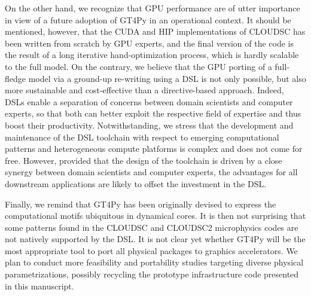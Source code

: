 \documentclass[main.tex]{subfiles}
\begin{document}
    On the other hand, we recognize that GPU performance are of utter importance in view of a future adoption of GT4Py in an operational context. It should be mentioned, however, that the CUDA and HIP implementations of CLOUDSC has been written from scratch by GPU experts, and the final version of the code is the result of a long iterative hand-optimization process, which is hardly scalable to the full model. On the contrary, we believe that the GPU porting of a full-fledge model via a ground-up re-writing using a DSL is not only possible, but also more sustainable and cost-effective than a directive-based approach. Indeed, DSLs enable a separation of concerns between domain scientists and computer experts, so that both can better exploit the respective field of expertise and thus boost their productivity. Notwithstanding, we stress that the development and maintenance of the DSL toolchain with respect to emerging computational patterns and heterogeneous compute platforms is complex and does not come for free. However, provided that the design of the toolchain is driven by a close synergy between domain scientists and computer experts, the advantages for all downstream applications are likely to offset the investment in the DSL.

    Finally, we remind that GT4Py has been originally devised to express the computational motifs ubiquitous in dynamical cores. It is then not surprising that some patterns found in the CLOUDSC and CLOUDSC2 microphysics codes are not natively supported by the DSL. %
    It is not clear yet whether GT4Py will be the most appropriate tool to port all physical packages to graphics accelerators. We plan to conduct more feasibility and portability studies targeting diverse physical parametrizations, possibly recycling the prototype infrastructure code presented in this manuscript.

    \biblio
\end{document}
